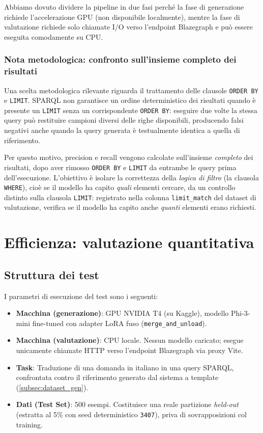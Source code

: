 \documentclass[12pt,a4paper,oneside]{book}
\newcommand{\code}[1]{\colorbox{light-gray}{\texttt{#1}}}
\begin{document}
Abbiamo dovuto dividere la pipeline in due fasi perché la fase di generazione richiede l'accelerazione GPU (non disponibile localmente), mentre la fase di valutazione richiede solo chiamate I/O verso l'endpoint Blazegraph e può essere eseguita comodamente su CPU.\@

\newpage

\subsubsection{Nota metodologica: confronto sull'insieme completo dei risultati}\label{subsec:nota_metodologica}

Una scelta metodologica rilevante riguarda il trattamento delle clausole \code{ORDER BY} e \code{LIMIT}. SPARQL non garantisce un ordine deterministico dei risultati quando è presente un \code{LIMIT} senza un corrispondente \code{ORDER BY}: eseguire due volte la stessa query può restituire campioni diversi delle righe disponibili, producendo falsi negativi anche quando la query generata è testualmente identica a quella di riferimento.

Per questo motivo, precision e recall vengono calcolate sull'insieme \emph{completo} dei risultati, dopo aver rimosso \code{ORDER BY} e \code{LIMIT} da entrambe le query prima dell'esecuzione. L'obiettivo è isolare la correttezza della \emph{logica di filtro} (la clausola \code{WHERE}), cioè se il modello ha capito \emph{quali} elementi cercare, da un controllo distinto sulla clausola \code{LIMIT}: registrato nella colonna \code{limit\_match} del dataset di valutazione, verifica se il modello ha capito anche \emph{quanti} elementi erano richiesti.

\section{Efficienza: valutazione quantitativa}\label{sec:efficienza}


\subsection{Struttura dei test}\label{subsec:struttura_test}

I parametri di esecuzione del test sono i seguenti:

\begin{itemize}
    \item \textbf{Macchina (generazione)}: GPU NVIDIA T4 (su Kaggle), modello Phi-3-mini fine-tuned con adapter LoRA fuso (\code{merge\_and\_unload}).
    \item \textbf{Macchina (valutazione)}: CPU locale. Nessun modello caricato; esegue unicamente chiamate HTTP verso l'endpoint Blazegraph via proxy Vite.
    \item \textbf{Task}: Traduzione di una domanda in italiano in una query SPARQL, confrontata contro il riferimento generato dal sistema a template (\cref{subsec:dataset_gen}).
    \item \textbf{Dati (Test Set)}: 500 esempi. Costituisce una reale partizione \textit{held-out} (estratta al 5\% con seed deterministico \code{3407}), priva di sovrapposizioni col training.
\end{itemize}
\end{document}
